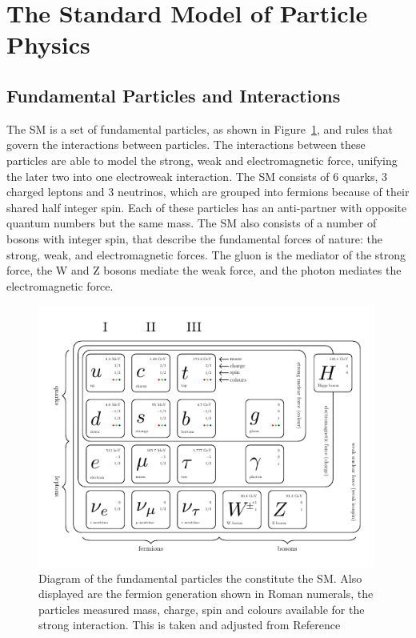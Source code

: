 \section{The Standard Model of Particle Physics}

\subsection{Fundamental Particles and Interactions}

The \ac{SM} is a set of fundamental particles, as shown in Figure~\ref{fig:sm_diagram}, and rules that govern the interactions between particles.
The interactions between these particles are able to model the strong, weak and electromagnetic force, unifying the later two into one electroweak interaction.
The \ac{SM} consists of 6 quarks, 3 charged leptons and 3 neutrinos, which are grouped into fermions because of their shared half integer spin. 
Each of these particles has an anti-partner with opposite quantum numbers but the same mass.
The \ac{SM} also consists of a number of bosons with integer spin, that describe the fundamental forces of nature: the strong, weak, and electromagnetic forces. 
The gluon is the mediator of the strong force, the W and Z bosons mediate the weak force, and the photon mediates the electromagnetic force. \\

\begin{figure}[!hbtp]
\centering
    \includegraphics[width=0.99\textwidth]{Figures/SM_diagram.pdf}
\caption{Diagram of the fundamental particles the constitute the SM. Also displayed are the fermion generation shown in Roman numerals, the particles measured mass, charge, spin and colours available for the strong interaction. This is taken and adjusted from Reference~\cite{sm_diagram}}
\label{fig:sm_diagram}
\end{figure}

